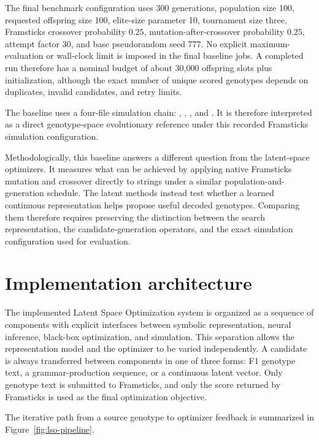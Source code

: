 The final benchmark configuration uses 300 generations, population size 100, requested offspring size 100, elite-size parameter 10, tournament size three, Framsticks crossover probability \(0.25\), mutation-after-crossover probability \(0.25\), attempt factor 30, and base pseudorandom seed 777. No explicit maximum-evaluation or wall-clock limit is imposed in the final baseline jobs. A completed run therefore has a nominal budget of about 30,000 offspring slots plus initialization, although the exact number of unique scored genotypes depends on duplicates, invalid candidates, and retry limits.

The baseline uses a four-file simulation chain: , , , and . It is therefore interpreted as a direct genotype-space evolutionary reference under this recorded Framsticks simulation configuration.

Methodologically, this baseline answers a different question from the latent-space optimizers. It measures what can be achieved by applying native Framsticks mutation and crossover directly to \fone{} strings under a similar population-and-generation schedule. The latent methods instead test whether a learned continuous representation helps propose useful decoded genotypes. Comparing them therefore requires preserving the distinction between the search representation, the candidate-generation operators, and the exact simulation configuration used for evaluation.

\section{Implementation architecture}

The implemented Latent Space Optimization system is organized as a sequence of components with explicit interfaces between symbolic representation, neural inference, black-box optimization, and simulation. This separation allows the representation model and the optimizer to be varied independently. A candidate is always transferred between components in one of three forms: F1 genotype text, a grammar-production sequence, or a continuous latent vector. Only genotype text is submitted to Framsticks, and only the score returned by Framsticks is used as the final optimization objective.

The iterative path from a source genotype to optimizer feedback is summarized in Figure~\ref{fig:lso-pipeline}.

